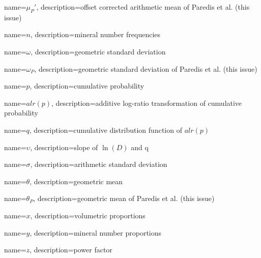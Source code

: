{
    name={\ensuremath{\mu_{P}'}},
    description={offset corrected arithmetic mean of Paredis et al. (this issue)}
}

{
    name={\ensuremath{n}},
    description={mineral number frequencies}
}

{
    name={\ensuremath{\omega}},
    description={geometric standard deviation}
}

{
    name={\ensuremath{\omega_{P}}},
    description={geometric standard deviation of Paredis et al. (this issue)}
}

{
    name={\ensuremath{p}},
    description={cumulative probability}
}

{
    name={\ensuremath{alr(p)}},
    description={additive log-ratio transformation of cumulative probability}
}

{
    name={\ensuremath{q}},
    description={cumulative distribution function of \(alr(p)\)}
}

{
    name={\ensuremath{\upsilon}},
    description={slope of \(\ln(D)\) and q}
}

{
    name={\ensuremath{\sigma}},
    description={arithmetic standard deviation}
}

{
    name={\ensuremath{\theta}},
    description={geometric mean}
}

{
    name={\ensuremath{\theta_{P}}},
    description={geometric mean of Paredis et al. (this issue)}
}

{
    name={\ensuremath{x}},
    description={volumetric proportions}
}

{
    name={\ensuremath{y}},
    description={mineral number proportions}
}

{
    name={\ensuremath{z}},
    description={power factor}
}
